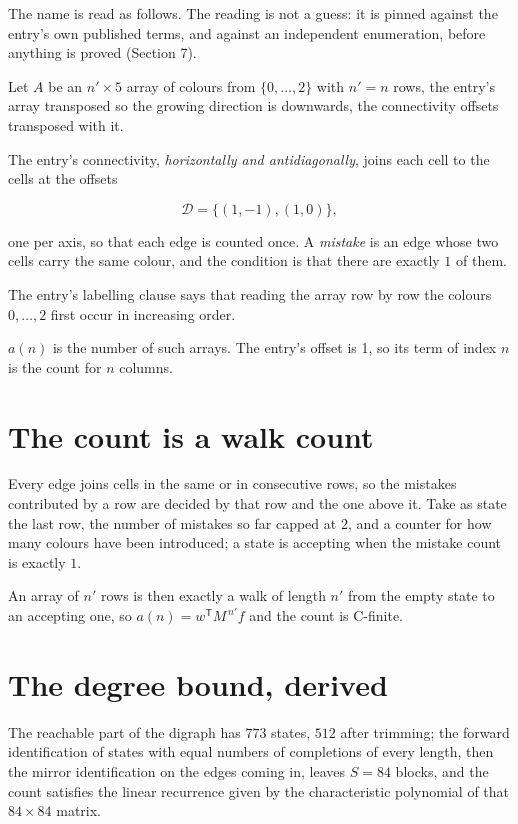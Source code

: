 \documentclass[11pt]{article}
\theoremstyle{definition}
\begin{document}
The name is read as follows. The reading is not a guess: it is pinned against the entry's own published terms, and against an independent enumeration, before anything is proved (Section 7).

Let $A$ be an $n' \times 5$ array of colours from $\{0,\dots,2\}$ with $n' = n$ rows, the entry's array transposed so the growing direction is downwards, the connectivity offsets transposed with it.

The entry's connectivity, {\itshape horizontally and antidiagonally}, joins each cell to the cells at the offsets

\[\mathcal{D} = \{(1,-1), (1,0)\},\]

one per axis, so that each edge is counted once. A {\itshape mistake} is an edge whose two cells carry the same colour, and the condition is that there are exactly $1$ of them.

The entry's labelling clause says that reading the array row by row the colours $0,\dots,2$ first occur in increasing order.

$a(n)$ is the number of such arrays. The entry's offset is 1, so its term of index $n$ is the count for $n$ columns.

\section{The count is a walk count}

Every edge joins cells in the same or in consecutive rows, so the mistakes contributed by a row are decided by that row and the one above it. Take as state the last row, the number of mistakes so far capped at $2$, and a counter for how many colours have been introduced; a state is accepting when the mistake count is exactly $1$.

An array of $n'$ rows is then exactly a walk of length $n'$ from the empty state to an accepting one, so $a(n) = w^{\mathsf T}M^{\,n'}f$ and the count is C-finite.

\section{The degree bound, derived}

The reachable part of the digraph has $773$ states, $512$ after trimming; the forward identification of states with equal numbers of completions of every length, then the mirror identification on the edges coming in, leaves $S = 84$ blocks, and the count satisfies the linear recurrence given by the characteristic polynomial of that $84\times84$ matrix.
\end{document}
